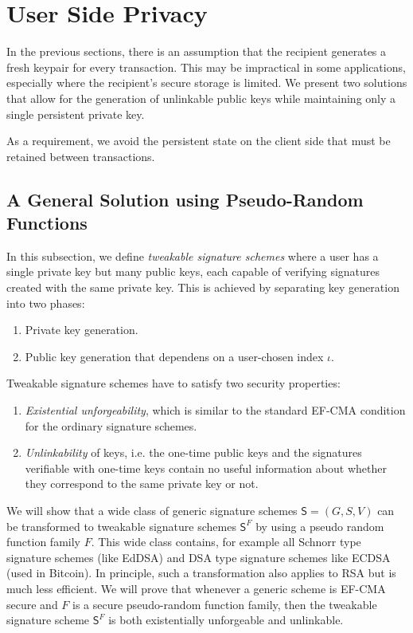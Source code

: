 \documentclass{article}
\begin{document}
\section{User Side Privacy}


In the previous sections, there is an assumption that the recipient generates a fresh keypair for every transaction. This may be impractical in some applications, especially where the recipient's secure storage is limited. We present two solutions that allow for the generation of unlinkable public keys while maintaining only a single persistent private key.

As a requirement, we avoid the persistent state on the client side that must be retained between transactions.

\subsection{A General Solution using Pseudo-Random Functions}

In this subsection, we define \emph{tweakable signature schemes} where a user has a single private key but many public keys, each capable of verifying signatures created with the same private key. This is achieved by separating key generation into two phases:
\begin{enumerate}
\item Private key generation.
\item Public key generation that dependens on a user-chosen index $\iota$.
\end{enumerate}
Tweakable signature schemes have to satisfy two security properties:
\begin{enumerate}
\item \emph{Existential unforgeability}, which is similar to the standard EF-CMA condition for the ordinary signature schemes.
\item \emph{Unlinkability} of keys, i.e. the one-time public keys and the signatures verifiable with one-time keys contain no useful information about whether they correspond to the same private key or not.
\end{enumerate}
We will show that a wide class of generic signature schemes $\mathsf{S}=(G,S,V)$ can
be transformed to tweakable signature schemes $\mathsf{S}^F$ by using a pseudo random function family $F$. This wide class contains, for example all Schnorr type signature schemes (like EdDSA) and DSA type signature schemes like ECDSA (used in Bitcoin). In principle, such a transformation also applies to RSA but is much less efficient.
We will prove that whenever a generic scheme is EF-CMA secure and $F$ is a secure pseudo-random function family, then the tweakable signature scheme $\mathsf{S}^F$ is both existentially unforgeable and unlinkable.
\end{document}
